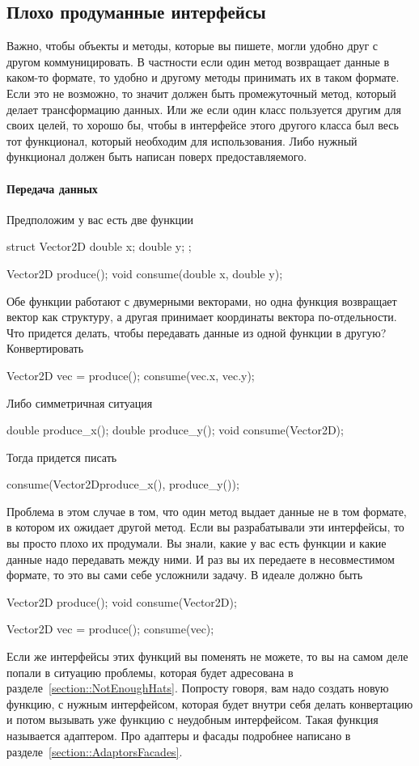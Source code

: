 \subsection{Плохо продуманные интерфейсы}
\label{section::BadInterfaces}

Важно, чтобы объекты и методы, которые вы пишете, могли удобно друг с другом коммуницировать.
В частности если один метод возвращает данные в каком-то формате, то удобно и другому методы принимать их в таком формате.
Если это не возможно, то значит должен быть промежуточный метод, который делает трансформацию данных.
Или же если один класс пользуется другим для своих целей, то хорошо бы, чтобы в интерфейсе этого другого класса был весь тот функционал, который необходим для использования.
Либо нужный функционал должен быть написан поверх предоставляемого.

\paragraph{Передача данных}

Предположим у вас есть две функции
\begin{cppcode}
struct Vector2D {
  double x;
  double y;
};

Vector2D produce();
void consume(double x, double y);
\end{cppcode}
Обе функции работают с двумерными векторами, но одна функция возвращает вектор как структуру, а другая принимает координаты вектора по-отдельности.
Что придется делать, чтобы передавать данные из одной функции в другую?
Конвертировать
\begin{cppcode}
Vector2D vec = produce();
consume(vec.x, vec.y);
\end{cppcode}
Либо симметричная ситуация
\begin{cppcode}
double produce_x();
double produce_y();
void consume(Vector2D);
\end{cppcode}
Тогда придется писать
\begin{cppcode}
consume(Vector2D{produce_x(), produce_y()});
\end{cppcode}
Проблема в этом случае в том, что один метод выдает данные не в том формате, в котором их ожидает другой метод.
Если вы разрабатывали эти интерфейсы, то вы просто плохо их продумали.
Вы знали, какие у вас есть функции и какие данные надо передавать между ними.
И раз вы их передаете в несовместимом формате, то это вы сами себе усложнили задачу.
В идеале должно быть
\begin{cppcode}
Vector2D produce();
void consume(Vector2D);

Vector2D vec = produce();
consume(vec);
\end{cppcode}
Если же интерфейсы этих функций вы поменять не можете, то вы на самом деле попали в ситуацию проблемы, которая будет адресована в разделе~\ref{section::NotEnoughHats}.
Попросту говоря, вам надо создать новую функцию, с нужным интерфейсом, которая будет внутри себя делать конвертацию и потом вызывать уже функцию с неудобным интерфейсом.
Такая функция называется адаптером.
Про адаптеры и фасады подробнее написано в разделе~\ref{section::AdaptorsFacades}.

